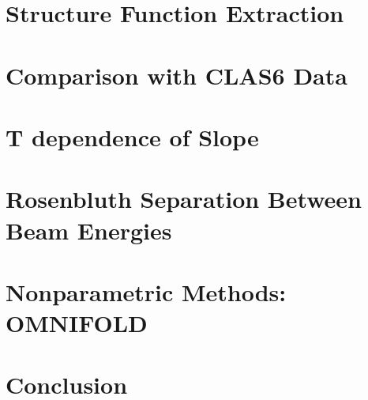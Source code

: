 \section{Structure Function Extraction}
\section{Comparison with CLAS6 Data}
\section{T dependence of Slope}

\section{Rosenbluth Separation Between Beam Energies}
\section{Nonparametric Methods: OMNIFOLD}
\section{Conclusion}